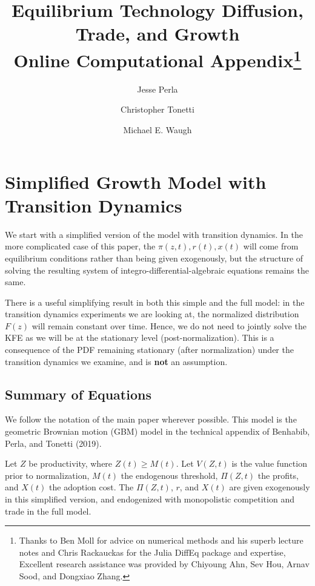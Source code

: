 \documentclass[11pt]{article}
\begin{document}
\title{Equilibrium Technology Diffusion, Trade, and Growth\\Online Computational Appendix\thanks{Thanks to Ben Moll for advice on numerical methods and his superb lecture notes and Chris Rackauckas for the Julia DiffEq package and expertise,  Excellent research assistance was provided by Chiyoung Ahn, Sev Hou, Arnav Sood, and Dongxiao Zhang.}}
\author{Jesse Perla \and Christopher Tonetti \and Michael E. Waugh}
\maketitle

\section{Simplified Growth Model with Transition Dynamics}
We start with a simplified version of the model with transition dynamics.  In the more complicated case of this paper, the $\pi(z,t), r(t), x(t)$ will come from equilibrium conditions rather than being given exogenously, but the structure of solving the resulting system of integro-differential-algebraic equations remains the same.

There is a useful simplifying result in both this simple and the full model: in the transition dynamics experiments we are looking at, the normalized distribution $F(z)$ will remain constant over time.  Hence, we do not need to jointly solve the KFE as we will be at the stationary level (post-normalization).  This is a consequence of the PDF remaining stationary (after normalization) under the transition dynamics we examine, and is \textbf{not} an assumption.

\subsection{Summary of Equations}\label{sec:summary-simple}
We follow the notation of the main paper wherever possible.  This model is the geometric Brownian motion (GBM) model in the technical appendix of Benhabib, Perla, and Tonetti (2019).

Let $Z$ be productivity, where $Z(t) \geq M(t)$.  Let $V(Z,t)$ is the value function prior to normalization, $M(t)$ the endogenous threshold, $\Pi(Z,t)$ the profits, and $X(t)$ the adoption cost.  The $\Pi(Z,t)$, $r$, and $X(t)$ are given exogenously in this simplified version, and endogenized with monopolistic competition and trade in the full model.
\end{document}
